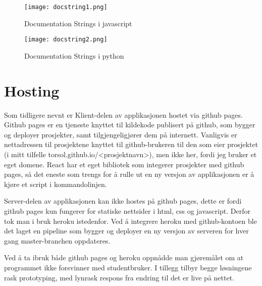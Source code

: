 \begin{figure}[h]
    \center
    \texttt{[image: docstring1.png]}
    \caption{Documentation Strings i javascript}
    \label{fig:doc1}
\end{figure}

\begin{figure}[h]
    \center
    \texttt{[image: docstring2.png]}
    \caption{Documentation Strings i python}
    \label{fig:doc2}
\end{figure}

\section{Hosting}
\label{sec:hosting}
Som tidligere nevnt er Klient-delen av applikasjonen hostet via github pages. Github pages er en tjeneste knyttet til kildekode publisert på github, som bygger og deployer prosjekter, samt tilgjengeligjører dem på internett. Vanligvis er nettadressen til prosjektene knyttet til github-brukeren til den som eier prosjektet (i mitt tilfelle torsol.github.io/<prosjektnavn>), men ikke her, fordi jeg bruker et eget domene. React har et eget bibliotek som integerer prosjekter med github pages, så det eneste som trengs for å rulle ut en ny versjon av applikasjonen er å kjøre et script i kommandolinjen. 

Server-delen av applikasjonen kan ikke hostes på github pages, dette er fordi github pages kun fungerer for statiske nettsider i html, css og javascript. Derfor tok man i bruk heroku istedenfor. Ved å integrere heroku med github-kontoen ble det laget en pipeline som bygger og deployer en ny versjon av serveren for hver gang master-branchen oppdateres. 

Ved å ta ibruk både github pages og heroku oppnådde man gjøremålet om at programmet ikke forsvinner med studentbruker. I tillegg tilbyr begge løsningene rask prototyping, med lynrask respons fra endring til det er live på nettet. 
